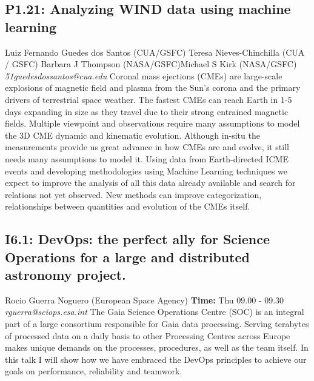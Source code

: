 \documentclass{report}
\begin{document}
\subsection*{P1.21: Analyzing WIND data using machine learning}
\bigskip
Luiz Fernando Guedes dos Santos (CUA/GSFC) \newline Teresa Nieves-Chinchilla (CUA / GSFC) \newline  Barbara J Thompson (NASA/GSFC)\newline  Michael S Kirk (NASA/GSFC)\newline  \newline  \newline\newline
{\it 51guedesdossantos@cua.edu}\newline
\newline\newline
Coronal mass ejections (CMEs) are large-scale explosions of magnetic field and plasma from the Sun's corona and the primary drivers of terrestrial space weather. The fastest CMEs can reach Earth in 1-5 days expanding in size as they travel due to their strong entrained magnetic fields. Multiple viewpoint and observations require many assumptions to model the 3D CME dynamic and kinematic evolution. Although in-situ the measurements provide us great advance in how CMEs are and evolve, it still needs many assumptions to model it. Using data from Earth-directed ICME events and developing methodologies using Machine Learning techniques we expect to improve the analysis of all this data already available and search for relations not yet observed. New methods can improve categorization, relationships between quantities and evolution of the CMEs itself.\newline
\newpage
\subsection*{I6.1: DevOps: the perfect ally for Science Operations for a large and distributed astronomy project.}
\bigskip
Rocio Guerra Noguero (European Space Agency) \newline   \newline   \newline   \newline  \newline  \newline\newline
{\bf Time:} Thu 09.00 - 09.30\newline
\newline
{\it rguerra@sciops.esa.int}\newline
\newline\newline
The Gaia Science Operations Centre (SOC) is an integral part of a large consortium responsible for Gaia data processing.
Serving terabytes of processed data on a daily basis to other Processing Centres across Europe makes unique demands on the processes, procedures, as well as the team itself.
In this talk I will show how we have embraced the DevOps principles to achieve our goals on performance, reliability and teamwork.\newline
\newpage
\end{document}

